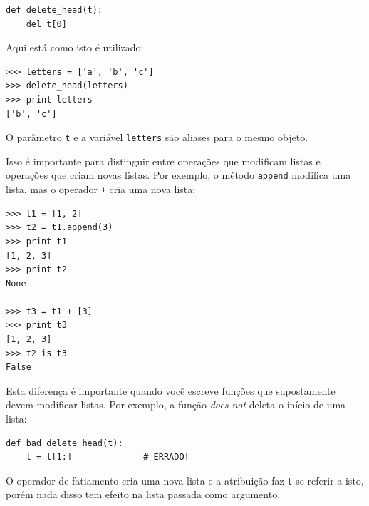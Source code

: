 \beforeverb
\begin{verbatim}
def delete_head(t):
    del t[0]
\end{verbatim}
\afterverb
%
Aqui está como isto é utilizado:


\beforeverb
\begin{verbatim}
>>> letters = ['a', 'b', 'c']
>>> delete_head(letters)
>>> print letters
['b', 'c']
\end{verbatim}
\afterverb
%
O parâmetro {\tt t} e a variável {\tt letters} são aliases para o mesmo objeto.


Isso é importante para distinguir entre operações que modificam listas e operações que criam novas listas.
Por exemplo, o método {\tt append} modifica uma lista, mas o operador {\tt +} cria uma nova lista:





\beforeverb
\begin{verbatim}
>>> t1 = [1, 2]
>>> t2 = t1.append(3)
>>> print t1
[1, 2, 3]
>>> print t2
None

>>> t3 = t1 + [3]
>>> print t3
[1, 2, 3]
>>> t2 is t3
False
\end{verbatim}
\afterverb

Esta diferença é importante quando você escreve funções que supostamente devem modificar listas.
Por exemplo, a função \emph{does not} deleta o início de uma lista:


\beforeverb
\begin{verbatim}
def bad_delete_head(t):
    t = t[1:]              # ERRADO!
\end{verbatim}
\afterverb

O operador de fatiamento cria uma nova lista e a atribuição faz {\tt t} se referir a isto,
porém nada disso tem efeito na lista passada como argumento.



